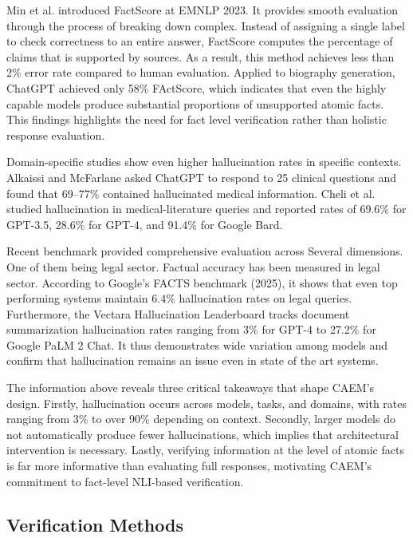 Min et al. \cite{min-etal-2023-factscore} introduced FactScore at EMNLP 2023. It provides smooth evaluation through the process of breaking down complex. Instead of assigning a single label to check correctness to an entire answer, FactScore computes the percentage of claims that is supported by sources. As a result, this method achieves less than 2\% error rate compared to human evaluation. Applied to biography generation, ChatGPT achieved only 58\% FActScore, which indicates that even the highly capable models produce substantial proportions of unsupported atomic facts. This findings highlights the need for fact level verification rather than holistic response evaluation.

Domain-specific studies show even higher hallucination rates in specific contexts. Alkaissi and McFarlane \cite{alkaissi2023artificial} asked ChatGPT to respond to 25 clinical questions and found that 69--77\% contained hallucinated medical information. Cheli et al.\ \cite{info:doi/10.2196/53164} studied hallucination in medical-literature queries and reported rates of 69.6\% for GPT-3.5, 28.6\% for GPT-4, and 91.4\% for Google Bard.

Recent benchmark provided comprehensive evaluation across Several dimensions. One of them being legal sector. Factual accuracy has been measured in legal sector. According to Google's FACTS benchmark (2025), it shows that even top performing systems maintain 6.4\% hallucination rates on legal queries. Furthermore, the Vectara Hallucination Leaderboard tracks document summarization hallucination rates ranging from 3\% for GPT-4 to 27.2\% for Google PaLM 2 Chat. It thus demonstrates wide variation among models and confirm that hallucination remains an issue even in state of the art systems.

The information above reveals three critical takeaways that shape CAEM's design. Firstly, hallucination occurs across models, tasks, and domains, with rates ranging from 3\% to over 90\% depending on context. Secondly, larger models do not automatically produce fewer hallucinations, which implies that architectural intervention is necessary. Lastly, verifying information at the level of atomic facts is far more informative than evaluating full responses, motivating CAEM's commitment to fact-level NLI-based verification.

\subsection{Verification Methods}

